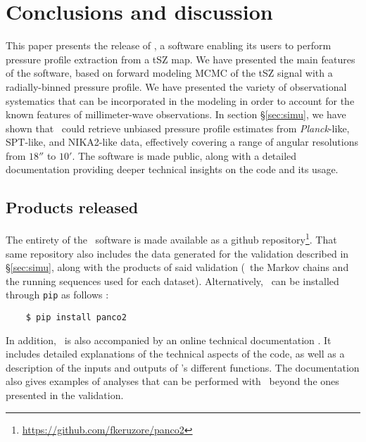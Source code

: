 \section{Conclusions and discussion} \label{sec:end}

This paper presents the release of \panco, a software enabling its users to perform pressure profile extraction from a tSZ map.
We have presented the main features of the software, based on forward modeling MCMC of the tSZ signal with a radially-binned pressure profile.
We have presented the variety of observational systematics that can be incorporated in the modeling in order to account for the known features of millimeter-wave observations.
In section \S\ref{sec:simu}, we have shown that \panco\ could retrieve unbiased pressure profile estimates from \textit{Planck}-like, SPT-like, and NIKA2-like data, effectively covering a range of angular resolutions from $18''$ to $10'$.
The software is made public, along with a detailed documentation providing deeper technical insights on the code and its usage.

\subsection{Products released}

The entirety of the \panco\ software is made available as a github repository\footnote{\url{https://github.com/fkeruzore/panco2}}.
That same repository also includes the data generated for the validation described in \S\ref{sec:simu}, along with the products of said validation (\ie\ the Markov chains and the running sequences used for each dataset).
Alternatively, \panco\ can be installed through \texttt{pip} as follows :
\begin{verbatim}
    $ pip install panco2
\end{verbatim}

In addition, \panco\ is also accompanied by an online technical documentation .
It includes detailed explanations of the technical aspects of the code, as well as a description of the inputs and outputs of \panco's different functions.
The documentation also gives examples of analyses that can be performed with \panco\ beyond the ones presented in the validation.

